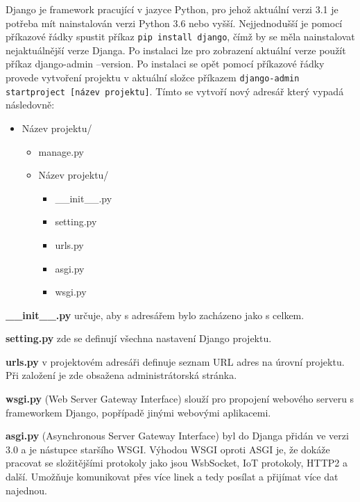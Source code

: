 Django je framework pracující v jazyce Python, pro jehož aktuální
verzi 3.1 je potřeba mít nainstalován verzi Python 3.6 nebo
vyšší. Nejjednodušší je pomocí příkazové řádky spustit příkaz {\tt pip
install django}, čímž by se měla nainstalovat nejaktuálnější verze
Djanga. Po instalaci lze pro zobrazení aktuální verze použít příkaz
django-admin --version. Po instalaci se opět pomocí příkazové řádky
provede vytvoření projektu v aktuální složce příkazem {\tt django-admin
startproject [název projektu]}. \cite{django-init} Tímto se vytvoří nový adresář který
vypadá následovně:

\begin{itemize}
	\item \lbrack Název projektu\rbrack /
	\begin{itemize}
		\item manage.py
		\item \lbrack Název projektu\rbrack /
		\begin{itemize}
			\item \_\_init\_\_.py
			\item setting.py
			\item urls.py
			\item asgi.py
			\item wsgi.py
		\end{itemize}
	\end{itemize}
\end{itemize}

\vspace{6px}

\textbf{\_\_init\_\_.py} určuje, aby s adresářem bylo zacházeno jako s celkem.
\vspace{6px}

\textbf{setting.py} zde se definují všechna nastavení Django projektu. 
\vspace{6px}

\textbf{urls.py} v projektovém adresáři definuje seznam URL adres na
úrovní projektu. Při založení je zde obsažena administrátorská
stránka.  \vspace{6px}

\textbf{wsgi.py} (Web Server Gateway Interface) slouží pro propojení
webového serveru s frameworkem Django, popřípadě jinými webovými
aplikacemi.  \vspace{6px}

\textbf{asgi.py} (Asynchronous Server Gateway Interface) byl do Djanga
přidán ve verzi 3.0 a je nástupce staršího WSGI. Výhodou WSGI oproti
ASGI je, že dokáže pracovat se složitějšími protokoly jako jsou
WsbSocket, IoT protokoly, HTTP2 a další. Umožňuje komunikovat přes
více linek a tedy posílat a přijímat více dat najednou.  \vspace{6px}

